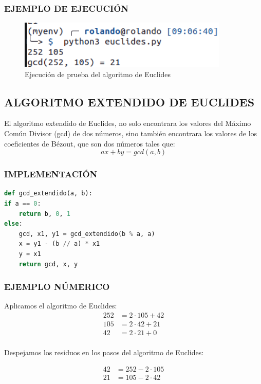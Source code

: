     \subsubsection{EJEMPLO DE EJECUCIÓN}
    \begin{figure}[H]
        \centering
        \includegraphics[width=10cm]{images/euclides_prueba.png}
        \caption{Ejecución de prueba del algoritmo de Euclides}
    \end{figure}

\subsection{ALGORITMO EXTENDIDO DE EUCLIDES}
El algoritmo extendido de Euclides, no solo encontrara los valores del Máximo Común Divisor (gcd) de dos números, sino también encontrara los valores de los coeficientes de Bézout, que son dos números tales que:
\[
    ax + by = gcd(a,b)
\]
    
    \subsubsection{IMPLEMENTACIÓN}
\begin{lstlisting}[language=Python]
def gcd_extendido(a, b):
if a == 0:
    return b, 0, 1
else:
    gcd, x1, y1 = gcd_extendido(b % a, a)
    x = y1 - (b // a) * x1
    y = x1
    return gcd, x, y
\end{lstlisting}
    
    \subsubsection{EJEMPLO NÚMERICO}
    Aplicamos el algoritmo de Euclides:
    \begin{align*} 
        252 &=  2\cdot105 + 42 \\ 
        105 &=  2\cdot42 + 21 \\
        42 &=  2\cdot21 + 0 \\ 
    \end{align*}
    
    Despejamos los residuos en los pasos del algoritmo de Euclides:

    \begin{align*} 
        42 &=  252 - 2\cdot105\\ 
        21 &=  105 - 2\cdot42\\ 
    \end{align*}

